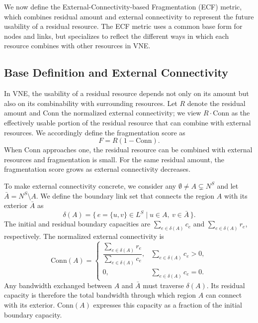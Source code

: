 \documentclass{ieeeaccess}
\newcommand{\ecf}{ECF}
\begin{document}
We now define the External-Connectivity-based Fragmentation (\ecf) metric, which combines residual
amount and external connectivity to represent the future usability of a residual resource. The
\ecf{} metric uses a common base form for nodes and links, but specializes to reflect the different
ways in which each resource combines with other resources in VNE.

\subsection{Base Definition and External Connectivity}
In VNE, the usability of a residual resource depends not only on its amount but also on its
combinability with surrounding resources. Let $R$ denote the residual amount and $\mathrm{Conn}$ the
normalized external connectivity; we view $R\cdot\mathrm{Conn}$ as the effectively usable portion of
the residual resource that can combine with external resources. We accordingly define the
fragmentation score as
\begin{equation}
	F=R(1-\mathrm{Conn}).
	\label{eq:base_frag}
\end{equation}
When $\mathrm{Conn}$ approaches one, the residual resource can be combined with external resources
and fragmentation is small. For the same residual amount, the fragmentation score grows as
external connectivity decreases.

To make external connectivity concrete, we consider any $\emptyset\neq A\subsetneq N^S$ and let
$\bar A=N^S\setminus A$. We define the boundary link set that connects the region $A$ with its
exterior $\bar A$ as
\begin{equation}
	\delta(A)
	=
	\{\,e=\{u,v\}\in L^S
	\mid
	u\in A,\ v\in\bar A\,\}.
	\label{eq:boundary}
\end{equation}
The initial and residual boundary capacities are $\sum_{e\in\delta(A)}c_e$ and
$\sum_{e\in\delta(A)}r_e$, respectively. The normalized external connectivity is
\begin{equation}
	\mathrm{Conn}(A)
	=
	\begin{cases}
		\dfrac{\sum_{e\in\delta(A)}r_e}{\sum_{e\in\delta(A)}c_e},
		  & \sum_{e\in\delta(A)}c_e>0, \\[1mm]
		0,
		  & \sum_{e\in\delta(A)}c_e=0. 
	\end{cases}
	\label{eq:conn}
\end{equation}
Any bandwidth exchanged between $A$ and $\bar A$ must traverse $\delta(A)$. Its residual capacity
is therefore the total bandwidth through which region $A$ can connect with its exterior.
$\mathrm{Conn}(A)$ expresses this capacity as a fraction of the initial boundary capacity.
\end{document}
